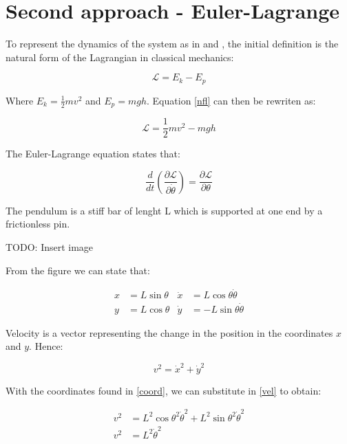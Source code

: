 \section{Second approach - Euler-Lagrange}

To represent the dynamics of the system as in \cite{JER12} and \cite{LUN02}, the initial definition is the natural form of the Lagrangian in classical mechanics:

\begin{equation} \label{nfl}
	\mathcal{L}=E_k-E_p
\end{equation}

Where $E_k=\frac{1}{2}mv^2$ and $E_p=mgh$. Equation \ref{nfl} can then be rewriten as:

\begin{equation} \label{nflr}
	\mathcal{L}=\frac{1}{2}mv^2-mgh
\end{equation}



The Euler-Lagrange equation states that:

\begin{equation} \label{ele}
	\frac{d}{dt}\left( \frac{\partial\mathcal{L}}{\partial\dot{\theta}} \right)=\frac{\partial\mathcal{L}}{\partial\theta}
\end{equation}

The pendulum is a stiff bar of lenght L which is supported at one end by a frictionless pin.

TODO: Insert image

From the figure we can state that:

\begin{equation} \label{coord}
	\begin{aligned}
		x&=L\sin{\theta} & \dot{x}&=L\cos{\theta}\dot{\theta}\\
		y&=L\cos{\theta} & \dot{y}&=-L\sin{\theta}\dot{\theta}
	\end{aligned}
\end{equation}

Velocity is a vector representing the change in the position in the coordinates $x$ and $y$. Hence:

\begin{equation} \label{vel}
	v^2=\dot{x}^2+\dot{y}^2
\end{equation}

With the coordinates found in \ref{coord}, we can substitute in \ref{vel} to obtain:

\begin{equation} \label{vels}
	\begin{split}
		v^2&=L^2\cos{\theta}^2\dot{\theta}^2+L^2\sin{\theta}^2\dot{\theta}^2\\
		v^2&=L^2\dot{\theta}^2
	\end{split}
\end{equation}

